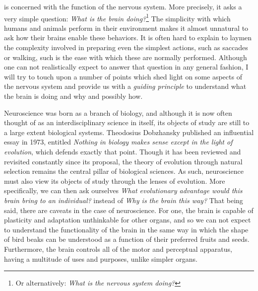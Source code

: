  is concerned with the function of the nervous system. More precisely, it asks a very simple question: {\em What is the brain doing?}\footnote{ Or alternatively: {\em What is the nervous system doing?}} The simplicity with which humans and animals perform in their environment makes it almost unnatural to ask how their brains enable these behaviors. It is often hard to explain to laymen the complexity involved in preparing even the simplest actions, such as saccades or walking, such is the ease with which these are normally performed. Although one can not realistically expect to answer that question in any general fashion, I will try to touch upon a number of points which shed light on some aspects of the nervous system and provide us with a {\em guiding principle} to understand what the brain is doing and why and possibly how.\par
Neuroscience was born as a branch of biology, and although it is now often thought of as  an interdisciplinary science in itself, its objects of study are still to a large extent biological systems. Theodosius Dobzhansky published an influential essay in 1973, entitled {\em Nothing in biology makes sense except in the light of evolution}\cite{Dobzhansky1973}, which defends exactly that point. Though it has been reviewed and revisited constantly since its proposal, the theory of evolution through natural selection remains the central pillar of biological sciences. As such, neuroscience must also view its objects of study through the lenses of evolution. More specifically, we can then ask ourselves {\em What evolutionary advantage would this brain bring to an individual?} instead of {\em Why is the brain this way?} That being said,  there are caveats in the case of neuroscience. For one, the brain is capable of plasticity and adaptation unthinkable for other organs, and so we can not expect to understand the functionality of the brain in the same way in which the shape of bird beaks can be understood as a function of their preferred fruits and seeds. Furthermore, the brain controls all of the motor and perceptual apparatus, having a multitude of uses and purposes, unlike simpler organs.\par
